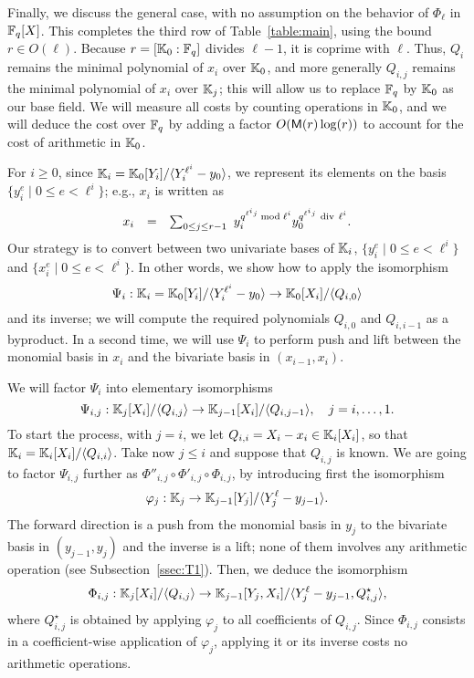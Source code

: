 \documentclass{sig-alternate}
\begin{document}
Finally, we discuss the general case, with no assumption on the
behavior of $\Phi_\ell$ in $\mathbb{F}_q[X]$. This completes the third row of
Table~\ref{table:main}, using the bound $r\in O(\ell)$.
Because $r=[\mathbb{K}_0 : \mathbb{F}_q]$ divides $\ell-1$, it is coprime with
$\ell$. Thus, $Q_i$ remains the minimal polynomial of $x_i$ over
$\mathbb{K}_0$, and more generally $Q_{i,j}$ remains the minimal polynomial of
$x_i$ over $\mathbb{K}_{j}$; this will allow us to replace $\mathbb{F}_q$ by $\mathbb{K}_0$ as
our base field. We will measure all costs by counting operations in
$\mathbb{K}_0$, and we will deduce the cost over $\mathbb{F}_q$ by adding a factor
$O(\mathsf{M}(r)\log(r))$ to account for the cost of arithmetic in $\mathbb{K}_0$.

For $i \ge 0$, since $\mathbb{K}_i=\mathbb{K}_0[Y_i]/\langle Y_i^{\ell^i}-y_0\rangle$,
we represent its elements on the basis $\{y_i^e \mid 0 \le e <
\ell^i\}$; e.g., $x_i$ is written as
$$
\begin{array}{ccc}
x_i &=& \sum_{0 \le j \le r-1}\ y_i^{q^{\ell^i j} \bmod \ell^i}
y_0^{q^{\ell^i j} {\rm~div~} \ell^i}. 
\end{array}
$$
Our strategy is to convert between two univariate bases of $\mathbb{K}_i$,
$\{y_i^e \mid 0 \le e < \ell^i\}$ and $\{x_i^e \mid 0 \le e <
\ell^i\}$. In other words, we show how to apply the isomorphism
$$\Psi_i: \mathbb{K}_i=\mathbb{K}_0[Y_i]/\langle Y_i^{\ell^i}-y_0\rangle \to
\mathbb{K}_0[X_i]/\langle Q_{i,0}\rangle$$ and its inverse; we will compute
the required polynomials $Q_{i,0}$ and $Q_{i,i-1}$ as a byproduct. In
a second time, we will use $\Psi_i$ to perform push and lift between
the monomial basis in $x_i$ and the bivariate basis in
$(x_{i-1},x_i)$.

We will factor $\Psi_i$ into elementary
isomorphisms
$$\Psi_{i,j}: \mathbb{K}_j[X_i]/\langle Q_{i,j}\rangle \to
\mathbb{K}_{j-1}[X_i]/\langle Q_{i,j-1}\rangle, \quad j=i,\dots,1.$$ To start
the process, with $j=i$, we let $Q_{i,i}=X_i-x_i \in \mathbb{K}_i[X_i]$, so
that $\mathbb{K}_i=\mathbb{K}_i[X_i]/\langle Q_{i,i} \rangle$.
Take now $j \le i$ and suppose that $Q_{i,j}$ is known. We are going to
factor $\Psi_{i,j}$ further as $\Phi''_{i,j} \circ \Phi'_{i,j} \circ
\Phi_{i,j}$, by introducing first the isomorphism
$$\varphi_j: \mathbb{K}_j \to \mathbb{K}_{j-1}[Y_j]/\langle Y_j^\ell-y_{j-1}\rangle.$$
The forward direction is a push from the monomial basis in $y_j$ to
the bivariate basis in $(y_{j-1},y_j)$ and the inverse is a lift; none
of them involves any arithmetic operation (see
Subsection~\ref{ssec:T1}).  Then, we deduce the isomorphism
$$\Phi_{i,j}: \mathbb{K}_j[X_i]/\langle Q_{i,j} \rangle \to
\mathbb{K}_{j-1}[Y_j,X_i]/\langle Y_j^\ell-y_{j-1}, Q^\star_{i,j}\rangle,$$
where $Q^\star_{i,j}$ is obtained by applying $\varphi_j$ to all
coefficients of $Q_{i,j}$. Since $\Phi_{i,j}$ consists in a
coefficient-wise application of $\varphi_j$, applying it or its
inverse costs no arithmetic operations.
\end{document}
